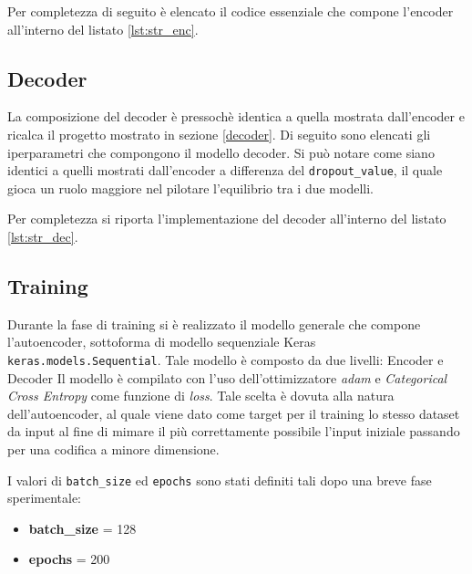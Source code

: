 Per completezza di seguito è elencato il codice essenziale che compone l'encoder all'interno del listato \ref{lst:str_enc}.




\subsection{Decoder}
\label{imp:autoe:dec}
La composizione del decoder è pressochè identica a quella mostrata dall'encoder e ricalca il progetto mostrato in sezione \ref{decoder}. Di seguito sono elencati gli iperparametri che compongono il modello decoder. Si può notare come siano identici a quelli mostrati dall'encoder a differenza del \lstinline!dropout_value!, il quale gioca un ruolo maggiore nel pilotare l'equilibrio tra i due modelli.



Per completezza si riporta l'implementazione del decoder all'interno del listato \ref{lst:str_dec}.

\pagebreak



\subsection{Training}
Durante la fase di training si è realizzato il modello generale che compone l'autoencoder, sottoforma di modello sequenziale Keras \lstinline!keras.models.Sequential!. Tale modello è composto da due livelli: Encoder e Decoder
Il modello è compilato con l'uso dell'ottimizzatore \textit{adam} e \textit{Categorical Cross Entropy} come funzione di \textit{loss}. Tale scelta è dovuta alla natura dell'autoencoder, al quale viene dato come target per il training lo stesso dataset da input al fine di mimare il più correttamente possibile l'input iniziale passando per una codifica a minore dimensione.



I valori di \lstinline!batch_size! ed \lstinline!epochs! sono stati definiti tali dopo una breve fase sperimentale:
\begin{itemize}
\item \textbf{batch\_size} = 128 
\item \textbf{epochs} = 200
\end{itemize}

